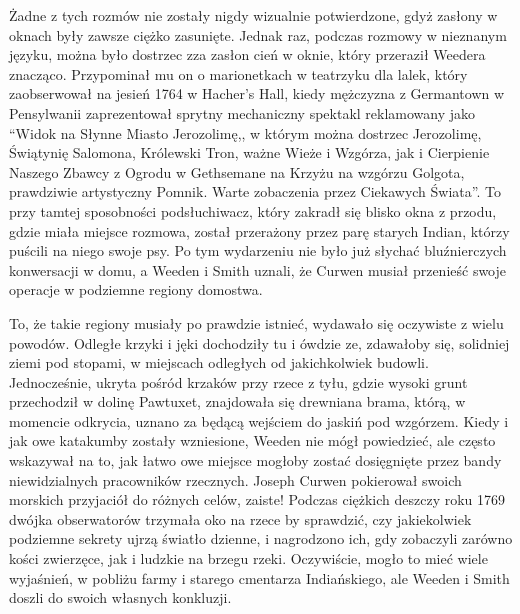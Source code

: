 Żadne z tych rozmów nie zostały nigdy wizualnie potwierdzone, gdyż zasłony w oknach były zawsze ciężko zasunięte. Jednak raz, podczas rozmowy w nieznanym języku, można było dostrzec zza zasłon cień w oknie, który przeraził Weedera znacząco. Przypominał mu on o marionetkach w teatrzyku dla lalek, który zaobserwował na jesień 1764 w Hacher's Hall, kiedy mężczyzna z Germantown w Pensylwanii zaprezentował sprytny mechaniczny spektakl reklamowany jako ``Widok na Słynne Miasto Jerozolimę,, w którym można dostrzec Jerozolimę, Świątynię Salomona, Królewski Tron, ważne Wieże i Wzgórza, jak i Cierpienie Naszego Zbawcy z Ogrodu w Gethsemane na Krzyżu na wzgórzu Golgota, prawdziwie artystyczny Pomnik. Warte zobaczenia przez Ciekawych Świata''. To przy tamtej sposobności podsłuchiwacz, który zakradł się blisko okna z przodu, gdzie miała miejsce rozmowa, został przerażony przez parę starych Indian, którzy puścili na niego swoje psy. Po tym wydarzeniu nie było już słychać bluźnierczych konwersacji w domu, a Weeden i Smith uznali, że Curwen musiał przenieść swoje operacje w podziemne regiony domostwa.

To, że takie regiony musiały po prawdzie istnieć, wydawało się oczywiste z wielu powodów. Odległe krzyki i jęki dochodziły tu i ówdzie ze, zdawałoby się, solidniej ziemi pod stopami, w miejscach odległych od jakichkolwiek budowli. Jednocześnie, ukryta pośród krzaków przy rzece z tyłu, gdzie wysoki grunt przechodził w dolinę Pawtuxet, znajdowała się drewniana brama, którą, w momencie odkrycia, uznano za będącą wejściem do jaskiń pod wzgórzem. Kiedy i jak owe katakumby zostały wzniesione, Weeden nie mógł powiedzieć, ale często wskazywał na to, jak łatwo owe miejsce mogłoby zostać dosięgnięte przez bandy niewidzialnych pracowników rzecznych. Joseph Curwen pokierował swoich morskich przyjaciół do różnych celów, zaiste! Podczas ciężkich deszczy roku 1769 dwójka obserwatorów trzymała oko na rzece by sprawdzić, czy jakiekolwiek podziemne sekrety ujrzą światło dzienne, i nagrodzono ich, gdy zobaczyli zarówno kości zwierzęce, jak i ludzkie na brzegu rzeki. Oczywiście, mogło to mieć wiele wyjaśnień, w pobliżu farmy i starego cmentarza Indiańskiego, ale Weeden i Smith doszli do swoich własnych konkluzji. 

